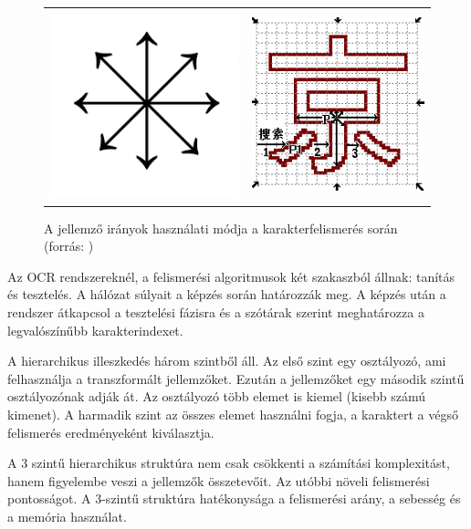 \begin{figure}[h]
\centering
\begin{tabular}{ c c }
\includegraphics[scale=0.6]{images/8direction} & \includegraphics[scale=0.6]{images/ocr_PDC}
\end{tabular}
\caption{A jellemző irányok használati módja a karakterfelismerés során (forrás: \cite{wu2002recognition})}
\label{fig:8direction}
\end{figure}

Az OCR rendszereknél, a felismerési algoritmusok két szakaszból állnak: tanítás és tesztelés. A hálózat súlyait a képzés során határozzák meg. A képzés után a rendszer átkapcsol a tesztelési fázisra és a szótárak szerint meghatározza a legvalószínűbb karakterindexet.

A hierarchikus illeszkedés három szintből áll. Az első szint egy osztályozó, ami felhasználja a transzformált jellemzőket. Ezután a jellemzőket egy második szintű osztályozónak adják át. Az osztályozó több elemet is kiemel (kisebb számú kimenet). A harmadik szint az összes elemet használni fogja, a karaktert a végső felismerés eredményeként kiválasztja.

A 3 szintű hierarchikus struktúra nem csak csökkenti a számítási komplexitást, hanem figyelembe veszi a jellemzők összetevőit. Az utóbbi növeli felismerési pontosságot. A 3-szintű struktúra hatékonysága a felismerési arány, a sebesség és a memória használat.

